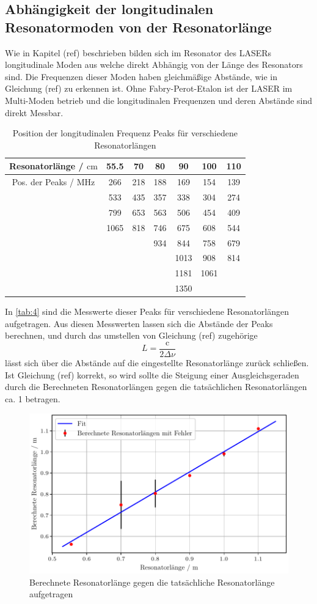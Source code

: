 \subsection{Abhängigkeit der longitudinalen Resonatormoden von der Resonatorlänge}
Wie in Kapitel (ref) beschrieben bilden sich im Resonator des LASERs longitudinale Moden aus welche direkt Abhängig von der Länge des Resonators sind. Die Frequenzen dieser Moden haben gleichmäßige Abstände, wie in Gleichung (ref) zu erkennen ist.
Ohne Fabry-Perot-Etalon ist der LASER im Multi-Moden betrieb und die longitudinalen Frequenzen und deren Abstände sind direkt Messbar. 
\begin{table}[H]
  \centering
  \caption{Position der longitudinalen Frequenz Peaks für verschiedene Resonatorlängen}
  \begin{tabular}{S ||S| S| S| S| S| S}
      \toprule
      {Resonatorlänge / $\mathrm{cm}$} & {55.5} & {70}  & {80} & {90} & {100}  & {110}\\
      \midrule
      {Pos. der Peaks / $\mathrm{MHz}$} & 266 & 218& 188& 169& 154& 139\\
       &533 & 435 & 357 & 338 & 304 & 274 \\
       &799 & 653 & 563 & 506 & 454 & 409 \\
       &1065 & 818 & 746 & 675 & 608 & 544 \\
       & & &934 & 844 & 758 & 679 \\
       & & & &1013 & 908 & 814 \\
       & & & & 1181 & 1061 & \\
       & & & & 1350 & & \\
      \bottomrule
  \end{tabular}
  \label{tab:4}
\end{table}
\noindent 
In \autoref{tab:4} sind die Messwerte dieser Peaks für verschiedene Resonatorlängen aufgetragen. Aus diesen Messwerten lassen sich die Abstände der Peaks berechnen, und durch das umstellen von Gleichung (ref) zugehörige
\begin{equation}
  L = \frac{\text{c}}{2 \Delta \nu}
\end{equation}
lässt sich über die Abstände auf die eingestellte Resonatorlänge zurück schließen. Ist Gleichung (ref) korrekt, so wird sollte die Steigung einer Ausgleichsgeraden durch die Berechneten Resonatorlängen gegen die tatsächlichen Resonatorlängen ca. 1 betragen.
\begin{figure}[H]
  \centering
  \includegraphics[width=0.65\linewidth]{plots/long_mode.pdf}
  \caption{Berechnete Resonatorlänge gegen die tatsächliche Resonatorlänge aufgetragen}
  \label{fig:3}
\end{figure}
